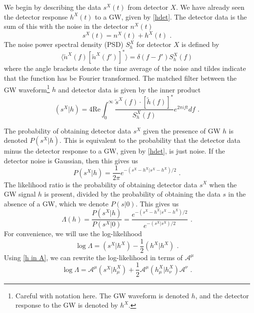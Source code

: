 \documentclass[11pt]{cuthesis}
\newcommand{\fs}{\text{ .}}
\begin{document}
We begin by describing the data $s^X(t)$ from detector $X$. We have already seen the detector response $h^X(t)$  to a GW, given by \ref{hdet}. The detector data is the sum of this with the noise in the detector $n^X(t)$
\begin{equation}
s^X(t) = n^X(t) + h^X(t) \fs
\end{equation}
The noise power spectral density (PSD) $S^X_h$ for detector $X$ is defined by
\begin{equation}
\langle \tilde{n}^X(f) [\tilde{n}^X(f')]^* \rangle = \delta (f-f') S^X_h(f)
\end{equation} 
where the angle brackets denote the time average of the noise and tildes indicate that the function has be Fourier transformed. The matched filter between the GW waveform\footnote{Careful with notation here. The GW waveform is denoted $h$, and the detector response to the GW is denoted by $h^X$.} $h$ and detector data is given by the inner product 
\begin{equation}
(s^X|h) = 4 \text{Re} \int^\infty_0 \frac{\tilde{s}^X(f) \cdot [\tilde{h}(f)]^*}{S^X_h (f)} e^{2\pi i ft}df \fs
\end{equation}

The probability of obtaining detector data $s^X$ given the presence of GW $h$ is denoted $P(s^X|h)$. This is equivalent to the probability that the detector data minus the detector response to a GW, given by \ref{hdet}, is just noise. If the detector noise is Gaussian, then this gives us
\begin{equation}
P(s^X|h) = \frac{1}{2\pi}  e^{-(s^X-h^X|s^X-h^X)/2} \fs
\end{equation}
The likelihood ratio is the probability of obtaining detector data $s^X$ when the GW signal $h$ is present, divided by the probability of obtaining the data $s$ in the absence of a GW, which we denote $P(s|0)$. This gives us
\begin{equation}
\Lambda (h) = \frac{P(s^X|h)}{P(s^X|0)} = \frac{e^{-(s^X-h^X|s^X-h^X)/2}}{e^{-(s^X|s^X)/2}} \fs
\end{equation}
For convenience, we will use the log-likelihood 
\begin{equation}
\log \Lambda = (s^X|h^X) - \frac{1}{2}(h^X|h^X) \fs
\end{equation}
Using \ref{h in A}, we can rewrite the log-likelihood in terms of $\mathcal{A}^\mu$
\begin{equation}
\log \Lambda = \mathcal{A}^\mu(s^X|h^X_\mu) + \frac{1}{2} \mathcal{A}^\mu (h^X_\mu | h^X_\nu) \mathcal{A}^\nu \fs
\end{equation}
\end{document}
